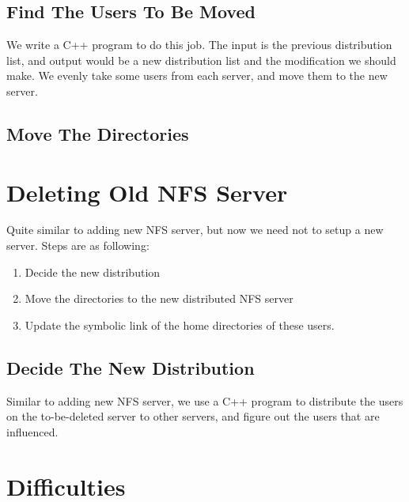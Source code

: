 \documentclass{article}
\begin{document}
\subsection{Find The Users To Be Moved}
We write a C++ program to do this job. The input is the previous distribution list, and output would be a new distribution list and
the modification we should make. We evenly take some users from each server, and move them to the new server.
\subsection{Move The Directories}
\section{Deleting Old NFS Server}
Quite similar to adding new NFS server, but now we need not to setup a new server.
Steps are as following:
   \begin{enumerate}
   \item Decide the new distribution
   \item Move the directories to the new distributed NFS server
   \item Update the symbolic link of the home directories of these users.
   \end{enumerate}
\subsection{Decide The New Distribution}
Similar to adding new NFS server, we use a C++ program to distribute the users on the to-be-deleted server to other servers,
and figure out the users that are influenced.
\section{Difficulties}
\end{document}
